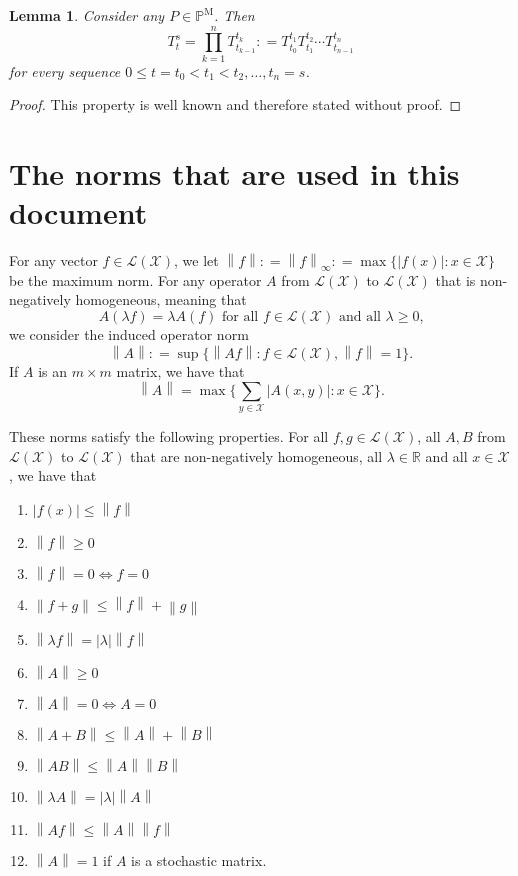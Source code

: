 \documentclass[a4paper,reqno]{amsart}
\newtheorem{lemma}[theorem]{Lemma}
\newcommand{\reals}{\mathbb{R}}
\newcommand{\states}{\mathcal{X}}
\newcommand{\processes}{\mathbb{P}}
\newcommand{\mprocesses}{\processes^{\mathrm{M}}}
\newcommand{\gambles}{\mathcal{L}}
\newcommand{\gamblesX}{\gambles(\states)}
\newcommand{\asa}{\Leftrightarrow}
\newcommand{\norm}[1]{\left\lVert #1 \right\rVert}
\newcommand{\abs}[1]{\left\vert #1 \right\vert}
\newcommand{\coloneqq}{:\!=}
\begin{document}
\begin{lemma}\label{lemma:transitionmatrixfactorises}
Consider any $P\in\mprocesses$. Then
\begin{equation*}
T_t^s=\prod_{k=1}^n T_{t_{k-1}}^{t_k} \coloneqq T_{t_0}^{t_1}T_{t_1}^{t_2}\cdots T_{t_{n-1}}^{t_n}
\end{equation*}
for every sequence $0\leq t=t_0<t_1<t_2,\dots,t_{n}=s$.
\end{lemma}
\begin{proof}
This property is well known and therefore stated without proof.
\end{proof}

\section{The norms that are used in this document}

For any vector $f\in\gamblesX$, we let $\norm{f}\coloneqq\norm{f}_{\infty}\coloneqq\max\{\abs {f(x)}\colon x\in\states\}$ be the maximum norm. For any operator $A$ from $\gamblesX$ to $\gamblesX$ that is non-negatively homogeneous, meaning that
\begin{equation*}
A(\lambda f)=\lambda A(f)\text{ for all $f\in\gamblesX$ and all $\lambda\geq0$,}
\end{equation*}
we consider the induced operator norm
\begin{equation*}
\norm{A}\coloneqq\sup\{\norm{Af}\colon f\in\gamblesX,\norm{f}=1\}.
\end{equation*}
If $A$ is an $m\times m$ matrix, we have that
\begin{equation*}
\norm{A}
=
\max\{\sum_{y\in\states}\abs{A(x,y)}\colon x\in\states\}.
\end{equation*}


\noindent
These norms satisfy the following properties. For all $f,g\in\gamblesX$, all $A,B$ from $\gamblesX$ to $\gamblesX$ that are non-negatively homogeneous, all $\lambda\in\reals$ and all $x\in\states$, we have that
\vspace{5pt}

\begin{enumerate}[label=N\arabic*:]
\item
$\abs{f(x)}\leq\norm{f}$
\item
$\norm{f}\geq0$
\item
$\norm{f}=0\asa f=0$
\item
$\norm{f+g}\leq\norm{f}+\norm{g}$
\item
$\norm{\lambda f}=\abs{\lambda}\norm{f}$
\item
$\norm{A}\geq0$
\item
$\norm{A}=0\asa A=0$
\item
$\norm{A+B}\leq\norm{A}+\norm{B}$
\item
$\norm{AB}\leq\norm{A}\norm{B}$
\item
$\norm{\lambda A}=\abs{\lambda}\norm{A}$
\item
$\norm{Af}\leq\norm{A}\norm{f}$
\item
$\norm{A}=1$ if $A$ is a stochastic matrix.
\end{enumerate}
\vspace{5pt}
\end{document}
